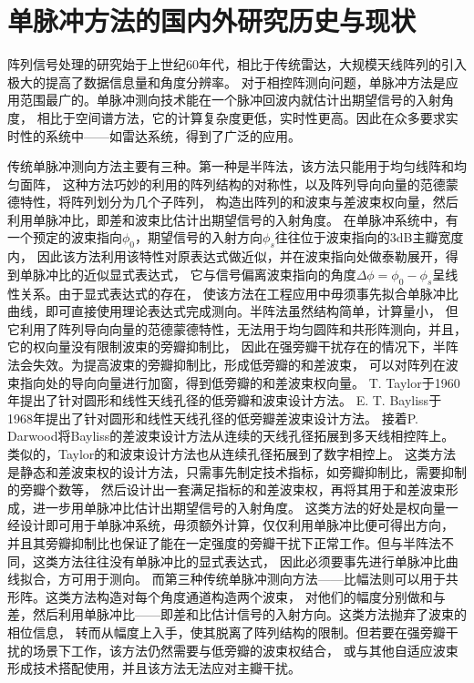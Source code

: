 \documentclass[master]{thesis-uestc}
\begin{document}
\section{单脉冲方法的国内外研究历史与现状}
阵列信号处理的研究始于上世纪60年代，相比于传统雷达，大规模天线阵列的引入极大的提高了数据信息量和角度分辨率。
对于相控阵测向问题，单脉冲方法是应用范围最广的。单脉冲测向技术能在一个脉冲回波内就估计出期望信号的入射角度，
相比于空间谱方法，它的计算复杂度更低，实时性更高。因此在众多要求实时性的系统中——如雷达系统，得到了广泛的应用。

传统单脉冲测向方法主要有三种。第一种是半阵法，该方法只能用于均匀线阵和均匀面阵，
这种方法巧妙的利用的阵列结构的对称性，以及阵列导向向量的范德蒙德特性，将阵列划分为几个子阵列，
构造出阵列的和波束与差波束权向量，然后利用单脉冲比，即差和波束比估计出期望信号的入射角度。
在单脉冲系统中，有一个预定的波束指向$\phi_0$，期望信号的入射方向$\phi_s$往往位于波束指向的3dB主瓣宽度内，
因此该方法利用该特性对原表达式做近似，并在波束指向处做泰勒展开，得到单脉冲比的近似显式表达式，
它与信号偏离波束指向的角度$\Delta\phi=\phi_0 - \phi_s$呈线性关系。由于显式表达式的存在，
使该方法在工程应用中毋须事先拟合单脉冲比曲线，即可直接使用理论表达式完成测向。半阵法虽然结构简单，计算量小，
但它利用了阵列导向向量的范德蒙德特性，无法用于均匀圆阵和共形阵测向，并且，它的权向量没有限制波束的旁瓣抑制比，
因此在强旁瓣干扰存在的情况下，半阵法会失效。为提高波束的旁瓣抑制比，形成低旁瓣的和差波束，
可以对阵列在波束指向处的导向向量进行加窗，得到低旁瓣的和差波束权向量。
T. Taylor于1960年提出了针对圆形和线性天线孔径的低旁瓣和波束设计方法。
E. T. Bayliss于1968年提出了针对圆形和线性天线孔径的低旁瓣差波束设计方法。
接着P. Darwood将Bayliss的差波束设计方法从连续的天线孔径拓展到多天线相控阵上。
类似的，Taylor的和波束设计方法也从连续孔径拓展到了数字相控上。
这类方法是静态和差波束权的设计方法，只需事先制定技术指标，如旁瓣抑制比，需要抑制的旁瓣个数等，
然后设计出一套满足指标的和差波束权，再将其用于和差波束形成，进一步用单脉冲比估计出期望信号的入射角度。
这类方法的好处是权向量一经设计即可用于单脉冲系统，毋须额外计算，仅仅利用单脉冲比便可得出方向，
并且其旁瓣抑制比也保证了能在一定强度的旁瓣干扰下正常工作。但与半阵法不同，这类方法往往没有单脉冲比的显式表达式，
因此必须要事先进行单脉冲比曲线拟合，方可用于测向。
而第三种传统单脉冲测向方法——比幅法则可以用于共形阵。这类方法构造对每个角度通道构造两个波束，
对他们的幅度分别做和与差，然后利用单脉冲比——即差和比估计信号的入射方向。这类方法抛弃了波束的相位信息，
转而从幅度上入手，使其脱离了阵列结构的限制。但若要在强旁瓣干扰的场景下工作，该方法仍然需要与低旁瓣的波束权结合，
或与其他自适应波束形成技术搭配使用，并且该方法无法应对主瓣干扰。
\end{document}
